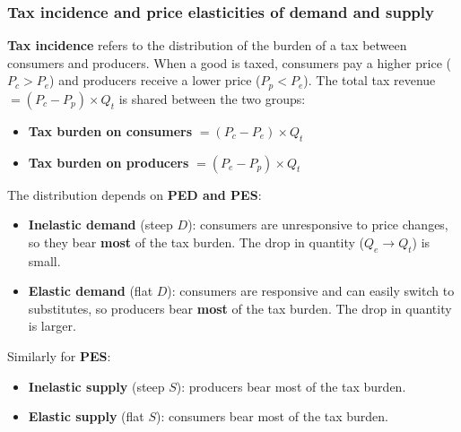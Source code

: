 \documentclass[a4paper,12pt]{article}
\begin{document}
\subsubsection*{Tax incidence and price elasticities of demand and supply}
\textbf{Tax incidence} refers to the distribution of the burden of a tax between consumers and producers. When a good is taxed, consumers pay a higher price ($P_c > P_e$) and producers receive a lower price ($P_p < P_e$). The total tax revenue $= (P_c - P_p) \times Q_t$ is shared between the two groups:
\begin{itemize}
  \item \textbf{Tax burden on consumers} $= (P_c - P_e) \times Q_t$
  \item \textbf{Tax burden on producers} $= (P_e - P_p) \times Q_t$
\end{itemize}
The distribution depends on \textbf{PED and PES}:
\begin{itemize}
  \item \textbf{Inelastic demand} (steep $D$): consumers are unresponsive to price changes, so they bear \textbf{most} of the tax burden. The drop in quantity ($Q_e \to Q_t$) is small.
  \item \textbf{Elastic demand} (flat $D$): consumers are responsive and can easily switch to substitutes, so producers bear \textbf{most} of the tax burden. The drop in quantity is larger.
\end{itemize}
Similarly for \textbf{PES}:
\begin{itemize}
  \item \textbf{Inelastic supply} (steep $S$): producers bear most of the tax burden.
  \item \textbf{Elastic supply} (flat $S$): consumers bear most of the tax burden.
\end{itemize}
\end{document}
